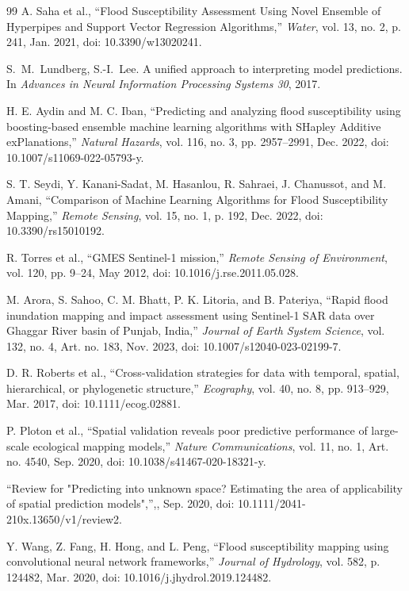\documentclass[10pt,twocolumn]{article}
\begin{document}
{\begin{thebibliography}{99}
A. Saha et al., ``Flood Susceptibility Assessment Using Novel Ensemble of Hyperpipes and Support Vector Regression Algorithms,'' \emph{Water}, vol. 13, no. 2, p. 241, Jan. 2021, doi: 10.3390/w13020241.

S.~M.~Lundberg, S.-I.~Lee. A unified approach to interpreting model predictions. In \emph{Advances in Neural Information Processing Systems 30}, 2017.

H. E. Aydin and M. C. Iban, ``Predicting and analyzing flood susceptibility using boosting-based ensemble machine learning algorithms with SHapley Additive exPlanations,'' \emph{Natural Hazards}, vol. 116, no. 3, pp. 2957--2991, Dec. 2022, doi: 10.1007/s11069-022-05793-y.

S. T. Seydi, Y. Kanani-Sadat, M. Hasanlou, R. Sahraei, J. Chanussot, and M. Amani, ``Comparison of Machine Learning Algorithms for Flood Susceptibility Mapping,'' \emph{Remote Sensing}, vol. 15, no. 1, p. 192, Dec. 2022, doi: 10.3390/rs15010192.

R. Torres et al., ``GMES Sentinel-1 mission,'' \emph{Remote Sensing of Environment}, vol. 120, pp. 9--24, May 2012, doi: 10.1016/j.rse.2011.05.028.

M. Arora, S. Sahoo, C. M. Bhatt, P. K. Litoria, and B. Pateriya, ``Rapid flood inundation mapping and impact assessment using Sentinel-1 SAR data over Ghaggar River basin of Punjab, India,'' \emph{Journal of Earth System Science}, vol. 132, no. 4, Art. no. 183, Nov. 2023, doi: 10.1007/s12040-023-02199-7.

D. R. Roberts et al., ``Cross-validation strategies for data with temporal, spatial, hierarchical, or phylogenetic structure,'' \emph{Ecography}, vol. 40, no. 8, pp. 913--929, Mar. 2017, doi: 10.1111/ecog.02881.

P. Ploton et al., ``Spatial validation reveals poor predictive performance of large-scale ecological mapping models,'' \emph{Nature Communications}, vol. 11, no. 1, Art. no. 4540, Sep. 2020, doi: 10.1038/s41467-020-18321-y.

``Review for "Predicting into unknown space? Estimating the area of applicability of spatial prediction models",'',, Sep. 2020, doi: 10.1111/2041-210x.13650/v1/review2.

Y. Wang, Z. Fang, H. Hong, and L. Peng, ``Flood susceptibility mapping using convolutional neural network frameworks,'' \emph{Journal of Hydrology}, vol. 582, p. 124482, Mar. 2020, doi: 10.1016/j.jhydrol.2019.124482.


\end{thebibliography}}
\end{document}
